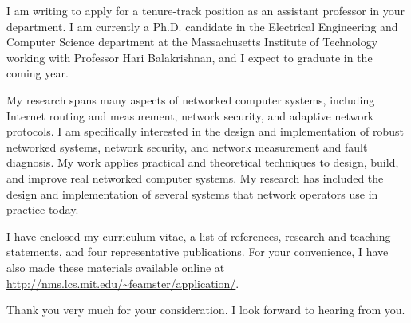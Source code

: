 
I am writing to apply for a tenure-track position as an assistant
professor in your department.  I am currently a Ph.D. candidate in the
Electrical Engineering and Computer Science department at the
Massachusetts Institute of Technology working with Professor Hari
Balakrishnan, and I expect to graduate in the coming year.

My research spans many aspects of networked computer systems, including
Internet routing and measurement, network security, and adaptive network
protocols.  I am specifically interested in the design and
implementation of robust networked systems, network security, and
network measurement and fault diagnosis.  My work applies practical and
theoretical techniques to design, build, and improve real networked
computer systems. My research has included the design and implementation of
several systems that network operators use in practice today.

I have enclosed my curriculum vitae, a list of references, research and
teaching statements, and four representative publications.  For your
convenience, I have also made these materials available online at
\url{http://nms.lcs.mit.edu/~feamster/application/}. 

Thank you very much for your consideration.  I look forward to hearing
from you.
